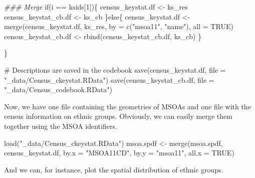 \documentclass[
  letterpaper,
]{scrbook}
\newenvironment{Shaded}{\begin{snugshade}}{\end{snugshade}}
\newcommand{\AttributeTok}[1]{\textcolor[rgb]{0.40,0.45,0.13}{#1}}
\newcommand{\CommentTok}[1]{\textcolor[rgb]{0.37,0.37,0.37}{#1}}
\newcommand{\ConstantTok}[1]{\textcolor[rgb]{0.56,0.35,0.01}{#1}}
\newcommand{\ControlFlowTok}[1]{\textcolor[rgb]{0.00,0.23,0.31}{#1}}
\newcommand{\DecValTok}[1]{\textcolor[rgb]{0.68,0.00,0.00}{#1}}
\newcommand{\DocumentationTok}[1]{\textcolor[rgb]{0.37,0.37,0.37}{\textit{#1}}}
\newcommand{\FunctionTok}[1]{\textcolor[rgb]{0.28,0.35,0.67}{#1}}
\newcommand{\NormalTok}[1]{\textcolor[rgb]{0.00,0.23,0.31}{#1}}
\newcommand{\OtherTok}[1]{\textcolor[rgb]{0.00,0.23,0.31}{#1}}
\newcommand{\SpecialCharTok}[1]{\textcolor[rgb]{0.37,0.37,0.37}{#1}}
\newcommand{\StringTok}[1]{\textcolor[rgb]{0.13,0.47,0.30}{#1}}
\begin{document}
\begin{Shaded}
\begin{Highlighting}[]
  \DocumentationTok{\#\#\# Merge}
  \ControlFlowTok{if}\NormalTok{(i }\SpecialCharTok{==}\NormalTok{ ksids[}\DecValTok{1}\NormalTok{])\{}
\NormalTok{    census\_keystat.df }\OtherTok{\textless{}{-}}\NormalTok{ ks\_res}
\NormalTok{    census\_keystat\_cb.df }\OtherTok{\textless{}{-}}\NormalTok{ ks\_cb}
\NormalTok{  \}}\ControlFlowTok{else}\NormalTok{\{}
\NormalTok{    census\_keystat.df }\OtherTok{\textless{}{-}} \FunctionTok{merge}\NormalTok{(census\_keystat.df, ks\_res, }\AttributeTok{by =} \FunctionTok{c}\NormalTok{(}\StringTok{"msoa11"}\NormalTok{, }\StringTok{"name"}\NormalTok{), }\AttributeTok{all =} \ConstantTok{TRUE}\NormalTok{)}
\NormalTok{    census\_keystat\_cb.df }\OtherTok{\textless{}{-}} \FunctionTok{rbind}\NormalTok{(census\_keystat\_cb.df, ks\_cb)}
\NormalTok{  \}}

\NormalTok{\}}


\CommentTok{\# Descriptions are saved in the codebook}
\FunctionTok{save}\NormalTok{(census\_keystat.df, }\AttributeTok{file =} \StringTok{"\_data/Census\_ckeystat.RData"}\NormalTok{)}
\FunctionTok{save}\NormalTok{(census\_keystat\_cb.df, }\AttributeTok{file =} \StringTok{"\_data/Census\_codebook.RData"}\NormalTok{)}
\end{Highlighting}
\end{Shaded}

Now, we have one file containing the geometries of MSOAs and one file
with the census information on ethnic groups. Obviously, we can easily
merge them together using the MSOA identifiers.

\begin{Shaded}
\begin{Highlighting}[]
\FunctionTok{load}\NormalTok{(}\StringTok{"\_data/Census\_ckeystat.RData"}\NormalTok{)}
\NormalTok{msoa.spdf }\OtherTok{\textless{}{-}} \FunctionTok{merge}\NormalTok{(msoa.spdf, census\_keystat.df,}
                   \AttributeTok{by.x =} \StringTok{"MSOA11CD"}\NormalTok{, }\AttributeTok{by.y =} \StringTok{"msoa11"}\NormalTok{, }\AttributeTok{all.x =} \ConstantTok{TRUE}\NormalTok{)}
\end{Highlighting}
\end{Shaded}

And we can, for instance, plot the spatial distribution of ethnic
groups.
\end{document}
